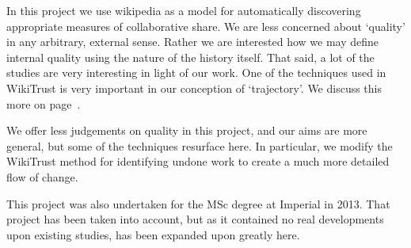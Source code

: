 In this project we use wikipedia as a model for automatically
discovering appropriate measures of collaborative share. We are less
concerned about `quality' in any arbitrary, external sense. Rather we
are interested how we may define internal quality using the nature of
the history itself. That said, a lot of the studies are very
interesting in light of our work. One of the techniques used in
WikiTrust is very important in our conception of `trajectory'. We
discuss this more on page~\pageref{sec:wikipedia}.

We offer less judgements on quality in this project, and our aims are
more general, but some of the techniques resurface here. In
particular, we modify the WikiTrust method for identifying undone work
to create a much more detailed flow of change.

This project was also undertaken for the MSc degree at Imperial in
2013. That project has been taken into account, but as it contained no
real developments upon existing studies, has been expanded upon
greatly here.
